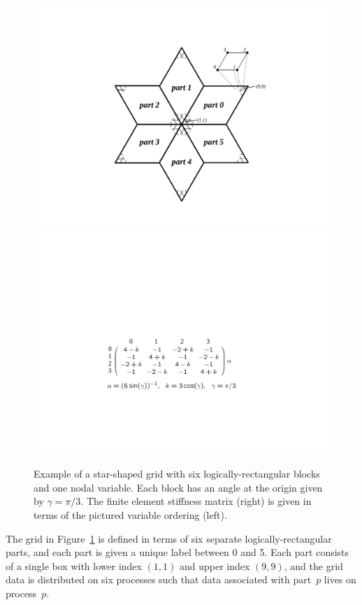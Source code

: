 \begin{figure} [t]
\centering
\includegraphics[width=.54\textwidth]{figSStructExample3a}
\hfill
\includegraphics[width=.44\textwidth]{figSStructExample3b}
\caption{%
Example of a star-shaped grid with six logically-rectangular blocks and one
nodal variable.  Each block has an angle at the origin given by $\gamma=\pi/3$.
The finite element stiffness matrix (right) is given in terms of the pictured
variable ordering (left).}
\label{fig-sstruct-fem-example}
\end{figure}


The grid in Figure~\ref{fig-sstruct-fem-example} is defined in terms of six
separate logically-rectangular parts, and each part is given a unique label
between 0 and 5.  Each part consists of a single box with lower index $(1,1)$
and upper index $(9,9)$, and the grid data is distributed on six processes such
that data associated with part~$p$ lives on process~$p$.

